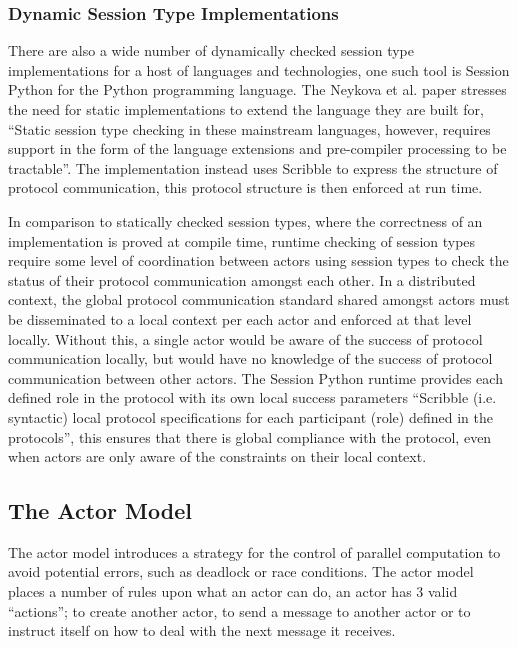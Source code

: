 \documentclass{article}
\begin{document}
	\subsubsection{Dynamic Session Type Implementations}
	There are also a wide number of dynamically checked session type implementations for a host of languages and technologies, one such tool is Session Python for the Python programming language\cite{neykova2013spy}. The Neykova et al. paper stresses the need for static implementations to extend the language they are built for, ``Static session type checking in these mainstream languages, however, requires support in the form of the language extensions and pre-compiler processing to be tractable''. The implementation instead uses Scribble\cite{honda2011scribbling} to express the structure of protocol communication, this protocol structure is then enforced at run time. 
	
	In comparison to statically checked session types, where the correctness of an implementation is proved at compile time, runtime checking of session types require some level of coordination between actors using session types to check the status of their protocol communication amongst each other. In a distributed context, the global protocol communication standard shared amongst actors must be disseminated to a local context per each actor and enforced at that level locally. Without this, a single actor would be aware of the success of protocol communication locally, but would have no knowledge of the success of protocol communication between other actors. The Session Python runtime provides each defined role in the protocol with its own local success parameters ``Scribble (i.e. syntactic) local protocol specifications for each participant (role) defined in the protocols''\cite{neykova2013spy}, this ensures that there is global compliance with the protocol, even when actors are only aware of the constraints on their local context.
	\subsection{The Actor Model}
	The actor model introduces a strategy for the control of parallel computation to avoid potential errors, such as deadlock or race conditions. The actor model places a number of rules upon what an actor can do, an actor has 3 valid “actions”; to create another actor, to send a message to another actor or to instruct itself on how to deal with the next message it receives.
	
\end{document}
